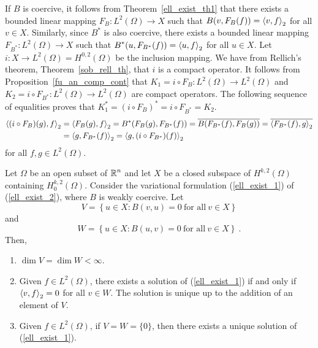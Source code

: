 If $B$ is coercive, it follows from Theorem~\ref{ell_exist_th1}
that there exists a bounded linear mapping
$\displaystyle F_B:L^2(\Omega)\to X$ such that
$\displaystyle  B(v,F_B(f)) = \left\langle{v} , {f}\right\rangle_2$ for all $v \in X$.
Similarly, since $\displaystyle B^\ast$ is also coercive, there exists a bounded
linear mapping $\displaystyle F_{B^\ast}:L^2(\Omega)\to X$ such that
$\displaystyle  B^\ast(u,F_{B^\ast}(f)) = \left\langle{u} , {f}\right\rangle_2$ for all
$u \in X$.  Let $\displaystyle i:X\to L^2(\Omega) = H^{0,2}(\Omega)$ be
the inclusion mapping.  We have from Rellich's theorem,
Theorem~\ref{sob_rell_th}, that $i$ is a compact operator.
It follows from Proposition~\ref{fu_an_comp_cont} that
$\displaystyle K_1=i \circ F_B:L^2(\Omega) \to L^2(\Omega)$
and $\displaystyle K_2=i \circ F_{B^\ast}:L^2(\Omega) \to L^2(\Omega)$ are
compact operators.  The following sequence of equalities proves that
$\displaystyle K_1^\ast = (i\circ F_B)^\ast = i \circ F_{B^\ast} = K_2$.
\begin{align*}
\left\langle{(i\circ F_B)(g)} , {f}\right\rangle_2 &= \left\langle{F_B(g)} , {f}\right\rangle_2 =
B^\ast(F_B(g), F_{B^\ast}(f))
= \overline{B(F_{B^\ast}(f), F_B(g))} =
\overline{\left\langle{F_{B^\ast}(f)} , {g}\right\rangle_2} \\
&= \left\langle{g} , {F_{B^\ast}(f)}\right\rangle_2 = \left\langle{g} , {(i\circ F_{B^\ast})(f)}\right\rangle_2
\end{align*}
for all $\displaystyle f,g \in L^2(\Omega)$.

\begin{theorem} \label{ell_exist_th2}
Let $\Omega$ be an open subset of $\displaystyle \mathbb{R}^n$ and let $X$ be a closed
subspace of $\displaystyle H^{k,2}(\Omega)$ containing
$\displaystyle H^{k,2}_0(\Omega)$.
Consider the variational formulation (\ref{ell_exist_1}) of
(\ref{ell_exist_2}), where $B$ is weakly coercive.  Let
\[
V = \left\{ u \in X : B(v,u)=0 \ \text{for all}\ v \in X \right\}
\]
and
\[
W = \left\{ u \in X : B(u,v)=0 \ \text{for all}\ v \in X \right\}\ .
\]
Then,
\begin{enumerate}
\item $\dim V = \dim W < \infty$.
\item Given $\displaystyle f \in L^2(\Omega)$, there exists a solution of
(\ref{ell_exist_1}) if and only if $\left\langle{v} , {f}\right\rangle_2=0$ for all $v\in W$.
The solution is unique up to the addition of an element of $V$.
\item Given $\displaystyle f \in L^2(\Omega)$, if $V=W=\{0\}$, then
there exists a unique solution of (\ref{ell_exist_1}).
\end{enumerate}
\end{theorem}

